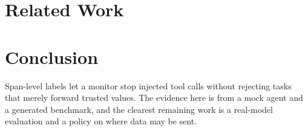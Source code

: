 \documentclass[conference]{IEEEtran}
\begin{document}
\section{Related Work}

\section{Conclusion}
Span-level labels let a monitor stop injected tool calls without rejecting tasks that merely
forward trusted values. The evidence here is from a mock agent and a generated benchmark,
and the clearest remaining work is a real-model evaluation and a policy on where data may be sent.
\end{document}
